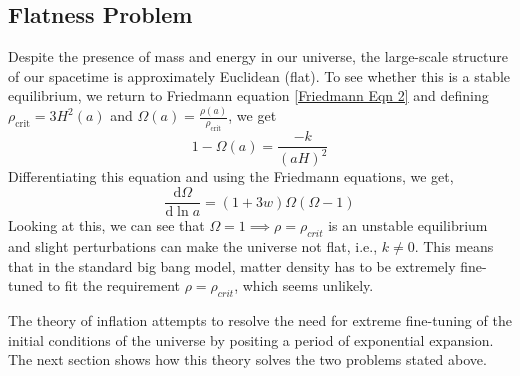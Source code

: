 \documentclass[aps,prd,reprint,preprintnumbers,showpacs,floatfix,nofootinbib,superscript address]{revtex4-2}
\begin{document}
\subsection{Flatness Problem} \label{Flatness Problem}
Despite the presence of mass and energy in our universe, the large-scale structure of our spacetime is approximately Euclidean (flat). To see whether this is a stable equilibrium, we return to Friedmann equation \cref{Friedmann Eqn 2} and defining $\rho_{\text{crit}} = 3H^2(a)$ and $\Omega(a) = \frac{\rho(a)}{\rho_{\text{crit}}}$, we get
\begin{equation}
    1 - \Omega(a) = \frac{-k}{(aH)^2}
\end{equation}
Differentiating this equation and using the Friedmann equations, we get,
\begin{equation}
    \frac{\mathrm{d}\Omega}{\mathrm{d} \ln a} = (1+3w)\Omega(\Omega-1)
\end{equation}
Looking at this, we can see that $\Omega = 1  \implies \rho = \rho_{crit}$ is an unstable equilibrium and slight perturbations can make the universe not flat, i.e., $k \neq 0$. This means that in the standard big bang model, matter density has to be extremely fine-tuned to fit the requirement $\rho = \rho_{crit}$, which seems unlikely.

The theory of inflation attempts to resolve the need for extreme fine-tuning of the initial conditions of the universe by positing a period of exponential expansion. The next section shows how this theory solves the two problems stated above.


\newpage
\,
\newpage
\printbibliography
\end{document}
